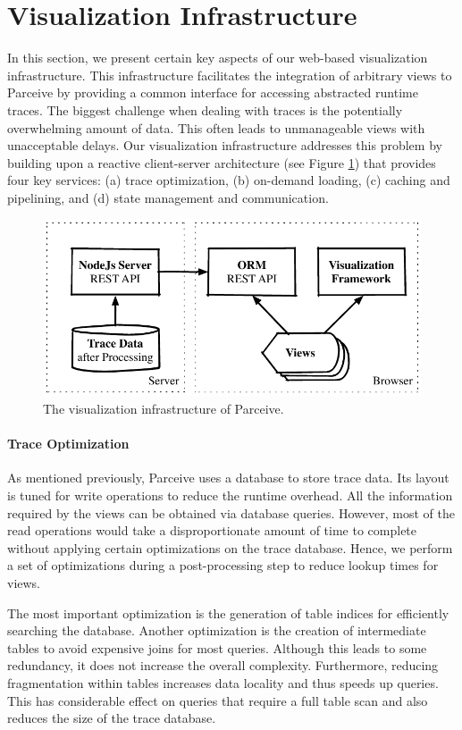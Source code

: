 \section{Visualization Infrastructure}
In this section, we present certain key aspects of our web-based visualization
infrastructure. This infrastructure facilitates the integration of arbitrary
views to Parceive by providing a common interface for accessing abstracted
runtime traces. The biggest challenge when dealing with traces is the
potentially overwhelming amount of data. This often leads to unmanageable views
with unacceptable delays. Our visualization infrastructure addresses this
problem by building upon a reactive client-server architecture (see Figure
\ref{fig:visualization}) that provides four key services: (a) trace
optimization, (b) on-demand loading, (c) caching and pipelining, and (d)
state management and communication.

\begin{figure}[h!]
\includegraphics[width=\linewidth]{img/visualization_framework}
\caption{The visualization infrastructure of Parceive.}
\label{fig:visualization}
\end{figure}

\paragraph{Trace Optimization}
As mentioned previously, Parceive uses a database to store trace data. Its
layout is tuned for write operations to reduce the runtime overhead. All the
information required by the views can be obtained via database queries.
However, most of the read operations would take a disproportionate amount of
time to complete without applying certain optimizations on the trace database.
Hence, we perform a set of optimizations during a post-processing step to
reduce lookup times for views.

The most important optimization is the generation of table indices for
efficiently searching the database. Another optimization is the creation of
intermediate tables to avoid expensive joins for most queries. Although this
leads to some redundancy, it does not increase the overall complexity.
Furthermore, reducing fragmentation within tables increases data locality and
thus speeds up queries. This has considerable effect on queries that require a
full table scan and also reduces the size of the trace database.

